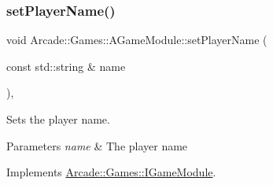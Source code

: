 \subsubsection{\texorpdfstring{setPlayerName()}{setPlayerName()}}
{\footnotesize\ttfamily void Arcade\+::\+Games\+::\+A\+Game\+Module\+::set\+Player\+Name (\begin{DoxyParamCaption}\item[{const std\+::string \&}]{name }\end{DoxyParamCaption})\hspace{0.3cm}{\ttfamily [final]}, {\ttfamily [virtual]}}



Sets the player name. 


\begin{DoxyParams}{Parameters}
{\em name} & The player name \\
\hline
\end{DoxyParams}


Implements \mbox{\hyperlink{classArcade_1_1Games_1_1IGameModule_aad433296fe8a4582ebfdad5827a13d59}{Arcade\+::\+Games\+::\+I\+Game\+Module}}.

